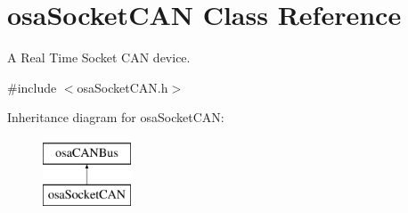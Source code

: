 \hypertarget{classosa_socket_c_a_n}{\section{osa\-Socket\-C\-A\-N Class Reference}
\label{classosa_socket_c_a_n}
}


A Real Time Socket C\-A\-N device.  




{\ttfamily \#include $<$osa\-Socket\-C\-A\-N.\-h$>$}

Inheritance diagram for osa\-Socket\-C\-A\-N\-:\begin{figure}[H]
\begin{center}
\leavevmode
\includegraphics[height=2.000000cm]{de/d5a/classosa_socket_c_a_n}
\end{center}
\end{figure}
